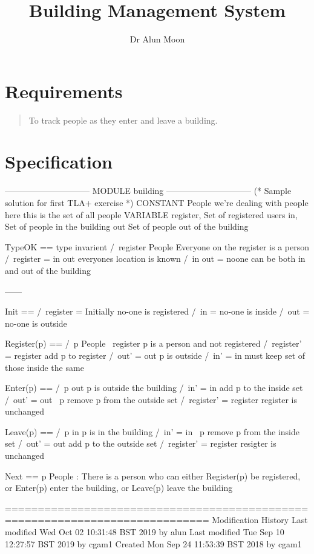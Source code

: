 \documentclass{article}
\title{Building Management System}
\author{Dr Alun Moon}
\begin{document}
\maketitle
\section{Requirements}
\begin{quote}
To track people as they enter and leave a building.
\end{quote}

\section{Specification}
\begin{tla}
------------------------------ MODULE building ------------------------------
(* Sample solution for first TLA+ exercise *)
CONSTANT
    People      \* we're dealing with people here
                \* this is the set of all people        
VARIABLE
    register,   \* Set of registered users
    in,         \* Set of people in the building
    out         \* Set of people out of the building
    
TypeOK ==  \* type invarient 
    /\ register \subseteq People    \* Everyone on the register is a person
    /\ register = in \union out     \* everyones location is known
    /\ in \intersect out = {}       \* noone can be both in and out of the building

------

Init ==
   /\ register = {}    \* Initially no-one is registered
   /\  in      = {}    \*           no-one is inside
   /\  out     = {}    \*           no-one is outside

Register(p) ==  
    /\  p \in People \ register        \* p is a person and not registered
    /\ register' = register  \* add p to register
    /\ out' = out            \* p is outside
    /\ in' = in                        \* must keep set of those inside the same

Enter(p) ==                  
    /\ p \in out               \* p is outside the building
    /\ in' = in      \* add p to the inside set
    /\ out' = out \ {p}        \* remove p from the outside set
    /\ register' = register    \* register is unchanged
    
Leave(p) ==
    /\ p \in in                \* p is in the building
    /\ in' = in \ {p}          \* remove p from the inside set
    /\ out' = out    \* add p to the outside set
    /\ register' = register    \* resigter is unchanged

Next ==
    \exists p \in People :   \* There is a person who can either
        \/ Register(p)       \* be registered, or
        \/ Enter(p)          \* enter the building, or
        \/ Leave(p)          \* leave the building

=============================================================================
\* Modification History
\* Last modified Wed Oct 02 10:31:48 BST 2019 by alun
\* Last modified Tue Sep 10 12:27:57 BST 2019 by cgam1
\* Created Mon Sep 24 11:53:39 BST 2018 by cgam1
\end{tla}
\end{document}
